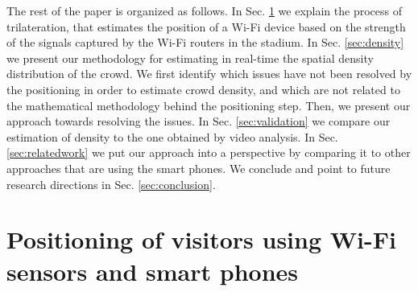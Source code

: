 \documentclass[10pt,a4paper]{article}
\begin{document}

The rest of the paper is organized as follows. In Sec. \ref{sec:positioning} we explain the process of trilateration, that estimates the position of a Wi-Fi device based on the strength of the signals captured by the Wi-Fi routers in the stadium. In Sec. \ref{sec:density} we present our methodology for estimating in real-time the spatial density distribution of the crowd. We first identify which issues have not been resolved by the positioning in order to estimate crowd density, and which are not related to the mathematical methodology behind the positioning step. Then, we present our approach towards resolving the issues. In Sec. \ref{sec:validation} we compare our estimation of density to the one  obtained by video analysis. In Sec. \ref{sec:relatedwork} we put our approach into a perspective by comparing it to other approaches that are using the smart phones. We conclude and point to future research directions in Sec. \ref{sec:conclusion}.





\section{Positioning of visitors using Wi-Fi sensors and smart phones}
\label{sec:positioning}
\end{document}
